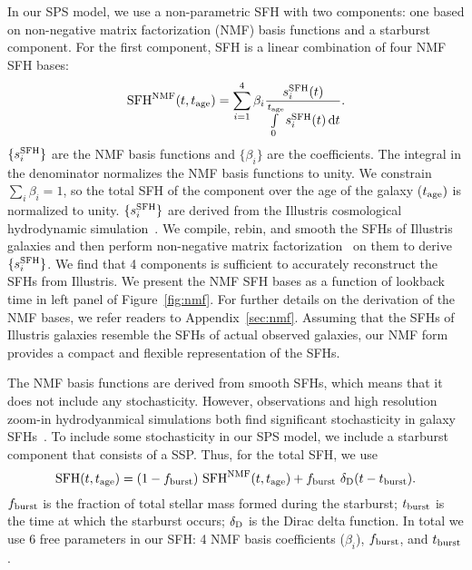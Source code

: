 In our SPS model, we use a non-parametric SFH with two components: one based on
non-negative matrix factorization (NMF) basis functions and a starburst component.
For the first component, SFH is a linear combination of four NMF SFH bases:
\begin{equation} \label{eq:nmf} 
    {\rm SFH}^{\rm NMF} (t, t_{\rm age}) = \sum\limits_{i=1}^{4} \beta_i
    \frac{s_i^{\rm SFH}(t)}{\int\limits_0^{t_{\rm age}} s_i^{\rm SFH}(t) \,
    {\rm d}t}. 
\end{equation} 
$\{s^{\rm SFH}_i\}$ are the NMF basis functions and $\{\beta_i\}$ are the
coefficients. 
The integral in the denominator normalizes the NMF basis functions to unity. 
We constrain $\sum_i \beta_i = 1$, so the total SFH of the component over the
age of the galaxy ($t_{\rm age})$ is normalized to unity.
$\{s^{\rm SFH}_i\}$ are derived from the Illustris cosmological hydrodynamic
simulation~\citep{vogelsberger2014, genel2014, nelson2015}.
We compile, rebin, and smooth the SFHs of Illustris galaxies and then perform
non-negative matrix factorization~\citep{lee1999,cichocki2009, fevotte2011} on
them to derive $\{s^{\rm SFH}_i\}$. 
We find that 4 components is sufficient to accurately reconstruct the SFHs
from Illustris. 
We present the NMF SFH bases as a function of lookback time in
left panel of Figure~\ref{fig:nmf}.
For further details on the derivation of the NMF bases, we refer readers to
Appendix~\ref{sec:nmf}. 
Assuming that the SFHs of Illustris galaxies resemble the SFHs of actual
observed galaxies, our NMF form provides a compact and flexible representation
of the SFHs. 

The NMF basis functions are derived from smooth SFHs, which means that it does
not include any stochasticity. 
However, observations and high resolution zoom-in hydrodyanmical simulations
both find significant stochasticity in galaxy SFHs~\citep{sparre2017,
caplar2019, hahn2019b, iyer2020}. 
To include some stochasticity in our SPS model, we include a starburst
component that consists of a SSP. 
Thus, for the total SFH, we use
\begin{equation} \label{eq:sfh}
    {\rm SFH} (t, t_{\rm age}) = (1 - f_{\rm burst})~{\rm SFH}^{\rm NMF} (t,
    t_{\rm age}) + f_{\rm burst}~\delta_{\rm D}(t - t_{\rm burst}).
\end{equation}
$f_{\rm burst}$ is the fraction of total stellar mass formed during the
starburst; $t_{\rm burst}$ is the time at which the starburst occurs; 
$\delta_{\rm D}$ is the Dirac delta function.
In total we use 6 free parameters in our SFH: 4 NMF basis coefficients 
($\beta_i$), $f_{\rm burst}$, and $t_{\rm burst}$. 

